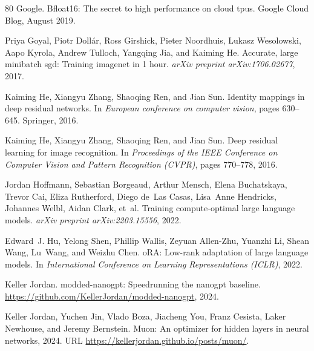 \documentclass[10pt,twocolumn,letterpaper]{article}
\theoremstyle{plain}
\theoremstyle{definition}
\theoremstyle{remark}
\begin{document}
{\begin{thebibliography}{80}
{Google}.
\newblock Bfloat16: The secret to high performance on cloud tpus.
\newblock Google Cloud Blog, August 2019.

Priya Goyal, Piotr Doll{\'a}r, Ross Girshick, Pieter Noordhuis, Lukasz
  Wesolowski, Aapo Kyrola, Andrew Tulloch, Yangqing Jia, and Kaiming He.
\newblock Accurate, large minibatch sgd: Training imagenet in 1 hour.
\newblock \emph{arXiv preprint arXiv:1706.02677}, 2017.

Kaiming He, Xiangyu Zhang, Shaoqing Ren, and Jian Sun.
\newblock Identity mappings in deep residual networks.
\newblock In \emph{European conference on computer vision}, pages 630--645.
  Springer, 2016{}.

Kaiming He, Xiangyu Zhang, Shaoqing Ren, and Jian Sun.
\newblock Deep residual learning for image recognition.
\newblock In \emph{Proceedings of the IEEE Conference on Computer Vision and
  Pattern Recognition (CVPR)}, pages 770--778, 2016{}.

Jordan Hoffmann, Sebastian Borgeaud, Arthur Mensch, Elena Buchatskaya, Trevor
  Cai, Eliza Rutherford, Diego de~Las Casas, Lisa~Anne Hendricks, Johannes
  Welbl, Aidan Clark, et~al.
\newblock Training compute-optimal large language models.
\newblock \emph{arXiv preprint arXiv:2203.15556}, 2022.

Edward~J. Hu, Yelong Shen, Phillip Wallis, Zeyuan Allen-Zhu, Yuanzhi Li, Shean
  Wang, Lu~Wang, and Weizhu Chen.
o{RA}: Low-rank adaptation of large language models.
\newblock In \emph{International Conference on Learning Representations
  (ICLR)}, 2022.

Keller Jordan.
\newblock modded-nanogpt: Speedrunning the nanogpt baseline.
\newblock \url{https://github.com/KellerJordan/modded-nanogpt}, 2024.

Keller Jordan, Yuchen Jin, Vlado Boza, Jiacheng You, Franz Cesista, Laker
  Newhouse, and Jeremy Bernstein.
\newblock Muon: An optimizer for hidden layers in neural networks, 2024.
\newblock URL \url{https://kellerjordan.github.io/posts/muon/}.


\end{thebibliography}}
\end{document}
